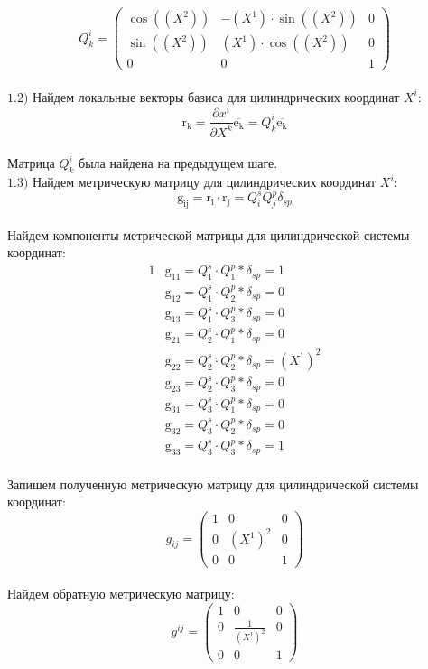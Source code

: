 \documentclass{article}
\begin{document}
\[
Q^i_k=\begin{pmatrix}
	\cos((X^2)) & -(X^1)\cdot \sin((X^2)) & 0\\
	\sin((X^2)) & (X^1)\cdot \cos((X^2)) & 0\\
	0 & 0 & 1
\end{pmatrix}
\]\\
$\mathrm{1.2)}$ Найдем локальные векторы базиса для цилиндрических координат $X^i$:\\
\[
\mathrm{r_k} = \frac{\partial x^i}{\partial X^k}\overline{\mathrm{e_k}} = Q^i_k\overline{\mathrm{e_k}}
\]\\
Матрица $Q^i_k$ была найдена на предыдущем шаге.\\
$\mathrm{1.3)}$ Найдем метрическую матрицу для цилиндрических координат $X^i$:\\
\[
\mathrm{g_{{ij}}} = \mathrm{r_i}\cdot\mathrm{r_j} = Q^s_iQ^p_j\delta_{sp}
\]\\
Найдем компоненты метрической матрицы для цилиндрической системы координат:\\
\begin{alignat*}{1}
  & \mathrm{g_{11}} = Q^s_1 \cdot Q^p_1 * \delta_{sp} = 1 \\
  & \mathrm{g_{12}} = Q^s_1 \cdot Q^p_2 * \delta_{sp} = 0 \\
  & \mathrm{g_{13}} = Q^s_1 \cdot Q^p_3 * \delta_{sp} = 0 \\
  & \mathrm{g_{21}} = Q^s_2 \cdot Q^p_1 * \delta_{sp} = 0 \\
  & \mathrm{g_{22}} = Q^s_2 \cdot Q^p_2 * \delta_{sp} = (X^1)^2 \\
  & \mathrm{g_{23}} = Q^s_2 \cdot Q^p_3 * \delta_{sp} = 0 \\
  & \mathrm{g_{31}} = Q^s_3 \cdot Q^p_1 * \delta_{sp} = 0 \\
  & \mathrm{g_{32}} = Q^s_3 \cdot Q^p_2 * \delta_{sp} = 0 \\
  & \mathrm{g_{33}} = Q^s_3 \cdot Q^p_3 * \delta_{sp} = 1 
\end{alignat*}\\
Запишем полученную метрическую матрицу для цилиндрической системы координат:\\
\[
g_{ij}=\begin{pmatrix}
	1 & 0 & 0\\
	0 & (X^1)^2 & 0\\
	0 & 0 & 1
\end{pmatrix}
\]\\
Найдем обратную метрическую матрицу:\\
\[
g^{ij}=\begin{pmatrix}
	1 & 0 & 0\\
	0 & \frac{1}{(X^1)^2} & 0\\
	0 & 0 & 1
\end{pmatrix}
\]\\
\end{document}

